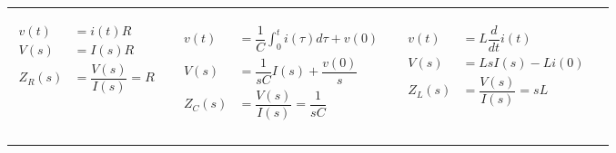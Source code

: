 \documentclass[aspectratio=169]{beamer}
\begin{document}
\begin{frame}[fragile]
\begin{tabular}{ll}
\begin{columns}
\begin{column}{.3\textwidth}
 \begin{equation}
\begin{aligned}
  v(t)  &= i(t)R\\
  V(s) &= I(s)R \nonumber\\
    Z_R(s) &= \dfrac{V(s)}{I(s)}=R \nonumber\\
  \end{aligned}
\end{equation}	
		\end{column}
\footnotesize		\begin{column}{.4\textwidth}  %
\begin{equation}
\begin{aligned}
 v(t) &= \dfrac{1}{C}\int_{0}^{t} i(\tau){d\tau} + v(0)\\
 V(s) &= \dfrac{1}{sC}I(s)+\dfrac{v(0)}{s} \nonumber\\
    Z_C(s) &= \dfrac{V(s)}{I(s)}= \dfrac{1}{sC} \nonumber\\
  \end{aligned}
\end{equation}	
		\end{column}
\footnotesize		\begin{column}{.4\textwidth}  %
\begin{equation}
\begin{aligned}
 v(t) &= L\dfrac{d}{dt}i(t)\\
 V(s) &= LsI(s)-Li(0) \nonumber\\
    Z_L(s) &= \dfrac{V(s)}{I(s)}= sL \nonumber\\
  \end{aligned}
\end{equation}		
		\end{column}
	\end{columns}\\
\end{tabular}	
\end{frame}
\end{document}
